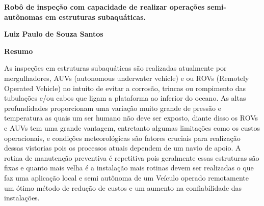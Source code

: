 \newpage
\thispagestyle{empty}
\begin{center}
 \vspace*{2cm}
\end{center}


\newpage
\thispagestyle{empty}
\begin{center}
  \textbf{\Large Robô de inspeção com capacidade de realizar operações semi-autônomas em estruturas subaquáticas.
  }

  \vspace*{1cm}
  \textbf{\large Luiz Paulo de Souza Santos}

  \vspace*{2cm}

  \textbf{\large Resumo}
\end{center}

As inspeções em estruturas subaquáticas são realizadas atualmente por mergulhadores, AUVs (autonomous underwater vehicle) e ou ROVs  (Remotely Operated Vehicle) no intuito de evitar a corrosão, trincas ou rompimento das tubulações e/ou cabos que ligam a plataforma ao inferior do oceano. As altas profundidades proporcionam uma variação muito grande de pressão e temperatura as quais um ser humano não deve ser exposto, diante disso os ROVs e AUVs tem uma grande vantagem, entretanto algumas limitações como os custos operacionais, e condições meteorológicas são fatores cruciais para realização dessas vistorias pois os processos atuais dependem de um navio de apoio. A rotina de manutenção preventiva é repetitiva pois geralmente essas estruturas são fixas e quanto mais velha é a instalação mais rotinas devem ser realizadas o que faz uma aplicação local e semi autônoma de um Veículo operado remotamente um ótimo método de redução de custos e um aumento na confiabilidade das instalações.

